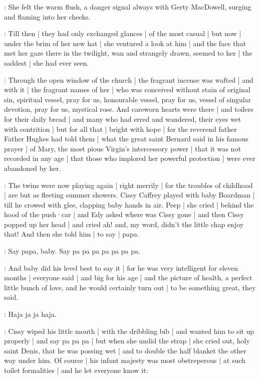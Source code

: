 \gertySex:
She felt the warm flush,
a danger signal always with Gerty MacDowell,
surging and flaming into her cheeks.

\gertyRomantic:
Till then |
they had only exchanged glances |
of the most casual |
but now |
under the brim of her new hat |
she ventured a look at him |
and the face that met her gaze there in the twilight,
wan and strangely drawn,
seemed to her |%
the saddest |
she had ever seen.

\Nrelig:
Through the open window of the church |
the fragrant incense was wafted |
and with it |
the fragrant names of her |
who was conceived without stain of original sin,
spiritual vessel,
pray for us,
honourable vessel,
pray for us,
vessel of singular devotion,
pray for us,
mystical rose.
And careworn hearts were there |
and toilers for their daily bread |
and many who had erred and wandered,
their eyes wet with contrition |
but for all that |
bright with hope |
for the reverend father Father Hughes
had told them |
what the great saint Bernard said in his famous prayer |
of Mary,
the most pious Virgin's intercessory power |
that it was not recorded in any age |
that those who implored her powerful protection |%
were ever abandoned by her.

:
The twins were now playing again |
right merrily |
for the troubles of childhood |
are but as fleeting summer showers.
Cissy Caffrey played with baby Boardman |
till he crowed with glee,
clapping baby hands in air.
Peep |
she cried |
behind the hood of the push·car |
and Edy asked where was Cissy gone |
and then Cissy popped up her head |
and cried ah!
and,
my word,
didn't the little chap enjoy that!
And then she told him |
to say |
papa.

\cissy:
Say papa,
baby.
Say pa pa pa pa pa pa pa.

:
And baby did his level best to say it |
for he was very intelligent for eleven months |
everyone said |
and big for his age |
and the picture of health,
a perfect little bunch of love,%
and he would certainly turn out |
to be something great,
they said.

\baby:
Haja ja ja haja.

:
Cissy wiped his little mouth |
with the dribbling bib |
and wanted him to sit up properly |
and say pa pa pa |
but when she undid the strap |
she cried out,
holy saint Denis,
that he was possing wet |
and to double the half blanket the other way under him.
Of course |
his infant majesty was most obstreperous |
at such toilet formalities |
and he let everyone know it:

